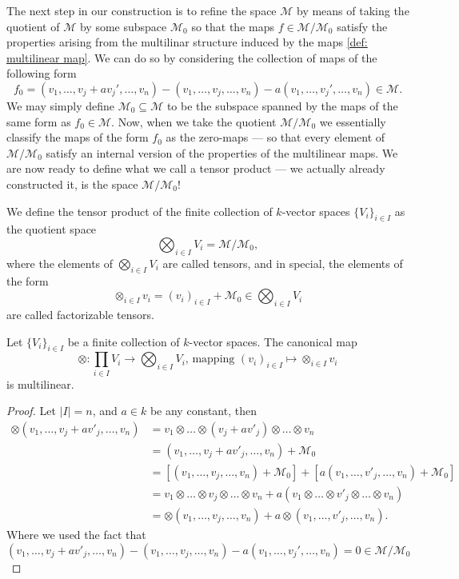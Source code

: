 The next step in our construction is to refine the space \(\mathcal M\) by means
of taking the quotient of \(\mathcal M\) by some subspace \(\mathcal M_0\) so
that the maps \(f \in \mathcal M / \mathcal M_0\) satisfy the properties arising
from the multilinar structure induced by the maps \cref{def: multilinear
  map}. We can do so by considering the collection of maps of the following form
\[
  f_0 = (v_1, \dots, v_j + av_j', \dots, v_n)
  - (v_1, \dots, v_j, \dots, v_n)
  - a(v_1, \dots, v_j', \dots, v_n) \in \mathcal M.
\]
We may simply define \(\mathcal M_0 \subseteq \mathcal M\) to be the subspace spanned by
the maps of the same form as \(f_0 \in \mathcal M\). Now, when we take the
quotient \(\mathcal M / \mathcal M_0\) we essentially classify the maps of the
form \(f_0\) as the zero-maps --- so that every element of \(\mathcal M / \mathcal
M_0\) satisfy an internal version of the properties of the multilinear maps. We
are now ready to define what we call a tensor product --- we actually already
constructed it, is the space \(\mathcal M / \mathcal M_{0}\)!

\begin{definition}\label{def: tensor product}
  We define the tensor product of the finite collection of \(k\)-vector spaces
  \(\{V_i\}_{i \in I}\) as the quotient space
  \[
    \bigotimes_{i \in I} V_i = \mathcal M / \mathcal M_0,
  \]
  where the elements of \(\bigotimes_{i \in I} V_i\) are called tensors, and in
  special, the elements of the form
  \[
    \otimes_{i \in I} v_i = (v_i)_{i \in I} + \mathcal M_0 \in \bigotimes_{i \in I} V_i
  \]
  are called factorizable tensors.
\end{definition}

\begin{lemma}\label{lem: tensor map}
  Let \(\{V_i\}_{i \in I}\) be a finite collection of \(k\)-vector spaces. The
  canonical map
  \[
    \otimes: \prod_{i \in I} V_i \to \bigotimes_{i \in I} V_i
    \text{, mapping }
    (v_i)_{i \in I} \longmapsto \otimes_{i \in I} v_i
  \]
  is multilinear.
\end{lemma}

\begin{proof}
  Let \(|I| = n\), and \(a \in k\) be any constant, then
  \begin{align*}
    \otimes(v_1, \dots, v_j + a v'_j, \dots, v_n)
    &= v_1 \otimes \dots \otimes (v_j + a v'_j) \otimes \dots \otimes v_n
    \\
    &= (v_1, \dots, v_j + a v'_j, \dots, v_n) + \mathcal M_0
    \\
    &= [(v_1, \dots, v_j, \dots, v_n) + \mathcal M_0]
    + [a (v_1, \dots, v'_j, \dots, v_n) + \mathcal M_0]
    \\
    &= v_1 \otimes \dots \otimes v_j \otimes \dots \otimes v_n
    + a(v_1 \otimes \dots \otimes v'_j \otimes \dots \otimes v_n)
    \\
    &= \otimes(v_1, \dots, v_j, \dots, v_n) + a \otimes(v_1, \dots, v'_j, \dots, v_n).
  \end{align*}
  Where we used the fact that
  \[
    (v_1, \dots, v_j + a v'_j, \dots, v_n) - (v_1, \dots, v_j, \dots, v_n)
    - a (v_1, \dots, v_j', \dots, v_n) = 0 \in \mathcal M / \mathcal M_{0}
  \]
\end{proof}

